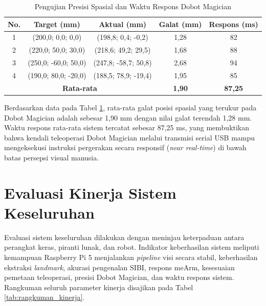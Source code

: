 \begin{table}[htbp]
\centering
\caption{Pengujian Presisi Spasial dan Waktu Respons Dobot Magician}
\label{tab:presisi_dobot}
\begin{tabular}{|c|c|c|c|c|}
\hline
\textbf{No.} & \textbf{Target (mm)} & \textbf{Aktual (mm)} & \textbf{Galat (mm)} & \textbf{Respons (ms)} \\ \hline
1 & (200,0; 0,0; 0,0) & (198,8; 0,4; -0,2) & 1,28 & 82 \\ \hline
2 & (220,0; 50,0; 30,0) & (218,6; 49,2; 29,5) & 1,68 & 88 \\ \hline
3 & (250,0; -60,0; 50,0) & (247,8; -58,7; 50,8) & 2,68 & 94 \\ \hline
4 & (190,0; 80,0; -20,0) & (188,5; 78,9; -19,4) & 1,95 & 85 \\ \hline
\multicolumn{3}{|c|}{\textbf{Rata-rata}} & \textbf{1,90} & \textbf{87,25} \\ \hline
\end{tabular}
\end{table}

Berdasarkan data pada Tabel \ref{tab:presisi_dobot}, rata-rata galat posisi spasial yang terukur pada Dobot Magician adalah sebesar 1,90 mm dengan nilai galat terendah 1,28 mm. Waktu respons rata-rata sistem tercatat sebesar 87,25 ms, yang membuktikan bahwa kendali teleoperasi Dobot Magician melalui transmisi serial USB mampu mengeksekusi instruksi pergerakan secara responsif (\textit{near real-time}) di bawah batas persepsi visual manusia.

\section{Evaluasi Kinerja Sistem Keseluruhan}
Evaluasi sistem keseluruhan dilakukan dengan meninjau keterpaduan antara perangkat keras, piranti lunak, dan robot. Indikator keberhasilan sistem meliputi kemampuan Raspberry Pi 5 menjalankan \textit{pipeline} visi secara stabil, keberhasilan ekstraksi \textit{landmark}, akurasi pengenalan SIBI, respons meArm, kesesuaian pemetaan teleoperasi, presisi Dobot Magician, dan waktu respons sistem. Rangkuman seluruh parameter kinerja disajikan pada Tabel \ref{tab:rangkuman_kinerja}.


